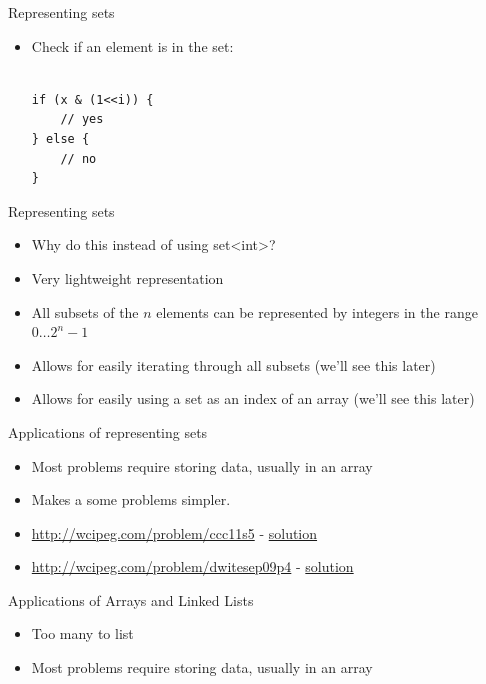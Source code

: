 \documentclass[10pt]{beamer}
\newcommand{\bi}{\begin{itemize}}
\newcommand{\ei}{\end{itemize}}
\begin{document}
\begin{frame}[fragile]{Representing sets}
    \vspace{25pt}
    \bi
        \item Check if an element is in the set:
            \begin{verbatim}

if (x & (1<<i)) {
    // yes
} else {
    // no
}
            \end{verbatim}
    \ei
\end{frame}

\begin{frame}{Representing sets}
    \vspace{25pt}
    \bi
        \item Why do this instead of using \alert{set<int>}?
        \item Very lightweight representation
        \item All subsets of the $n$ elements can be represented by integers in the range $0\ldots 2^{n}-1$
        \item Allows for easily iterating through all subsets (we'll see this later)
        \item Allows for easily using a set as an index of an array (we'll see this later)
    \ei
\end{frame}

\begin{frame}{Applications of representing sets}
    \vspace{40pt}
    \bi
        \item Most problems require storing data, usually in an array
        \item Makes a some problems simpler.  
        \item \href{http://wcipeg.com/problem/ccc11s5}{http://wcipeg.com/problem/ccc11s5} - \href{https://gist.github.com/wgma00/a9eb7deddfc50b546cd600324f773450}{solution}
        \item \href{http://wcipeg.com/problem/dwitesep09p4}{http://wcipeg.com/problem/dwitesep09p4} - \href{https://gist.github.com/wgma00/b86540ace0a8d664ef57fd6c4df9708f}{solution}
    \ei
\end{frame}


\begin{frame}{Applications of Arrays and Linked Lists}
    \vspace{40pt}
    \bi
        \item Too many to list
        \item Most problems require storing data, usually in an array
    \ei
\end{frame}
\end{document}
